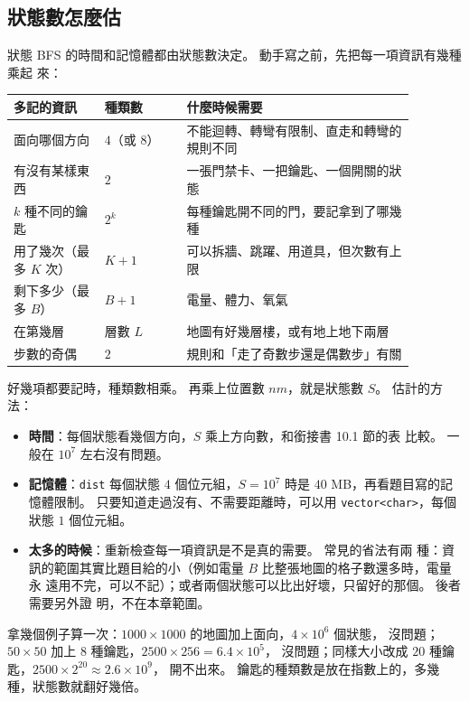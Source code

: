 \subsection{狀態數怎麼估}
\label{sec:state-count}

狀態 BFS 的時間和記憶體都由狀態數決定。 動手寫之前，先把每一項資訊有幾種乘起
來：

\begin{center}
\begin{tabular}{p{0.2\linewidth}p{0.18\linewidth}p{0.5\linewidth}}
\toprule
多記的資訊 & 種類數 & 什麼時候需要 \\
\midrule
面向哪個方向 & $4$（或 $8$） & 不能迴轉、轉彎有限制、直走和轉彎的規則不同 \\
有沒有某樣東西 & $2$ & 一張門禁卡、一把鑰匙、一個開關的狀態 \\
$k$ 種不同的鑰匙 & $2^k$ & 每種鑰匙開不同的門，要記拿到了哪幾種 \\
用了幾次（最多 $K$ 次）& $K + 1$ & 可以拆牆、跳躍、用道具，但次數有上限 \\
剩下多少（最多 $B$）& $B + 1$ & 電量、體力、氧氣 \\
在第幾層 & 層數 $L$ & 地圖有好幾層樓，或有地上地下兩層 \\
步數的奇偶 & $2$ & 規則和「走了奇數步還是偶數步」有關 \\
\bottomrule
\end{tabular}
\end{center}

好幾項都要記時，種類數相乘。 再乘上位置數 $nm$，就是狀態數 $S$。 估計的方法：

\begin{itemize}
\item \textbf{時間}：每個狀態看幾個方向，$S$ 乘上方向數，和銜接書 10.1 節的表
比較。 一般在 $10^7$ 左右沒有問題。
\item \textbf{記憶體}：\texttt{dist} 每個狀態 $4$ 個位元組，$S = 10^7$ 時是
$40$ MB，再看題目寫的記憶體限制。 只要知道走過沒有、不需要距離時，可以用
\texttt{vector<char>}，每個狀態 $1$ 個位元組。
\item \textbf{太多的時候}：重新檢查每一項資訊是不是真的需要。 常見的省法有兩
種：資訊的範圍其實比題目給的小（例如電量 $B$ 比整張地圖的格子數還多時，電量永
遠用不完，可以不記）；或者兩個狀態可以比出好壞，只留好的那個。 後者需要另外證
明，不在本章範圍。
\end{itemize}

拿幾個例子算一次：$1000 \times 1000$ 的地圖加上面向，$4 \times 10^6$ 個狀態，
沒問題；$50 \times 50$ 加上 $8$ 種鑰匙，$2500 \times 256 = 6.4 \times 10^5$，
沒問題；同樣大小改成 $20$ 種鑰匙，$2500 \times 2^{20} \approx 2.6 \times 10^9$，
開不出來。 鑰匙的種類數是放在指數上的，多幾種，狀態數就翻好幾倍。

